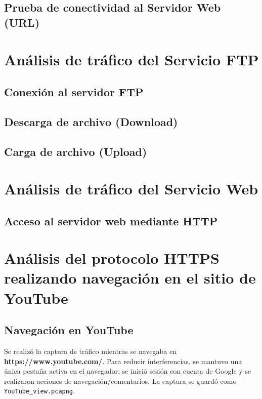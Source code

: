 \documentclass[10pt]{article}
\begin{document}
\subsection{Prueba de conectividad al Servidor Web (URL)}


\renewcommand{\thesection}{8.\arabic{section}}
\section{Análisis de tráfico del Servicio FTP}
\subsection{Conexión al servidor FTP}
\subsection{Descarga de archivo (Download)}
\subsection{Carga de archivo (Upload)}

\renewcommand{\thesection}{8.\arabic{section}}
\section{Análisis de tráfico del Servicio Web}
\subsection{Acceso al servidor web mediante HTTP}

\renewcommand{\thesection}{8.\arabic{section}}
\section{Análisis del protocolo HTTPS realizando navegación en el sitio de YouTube}

\subsection{Navegación en YouTube}
Se realizó la captura de tráfico mientras se navegaba en \textbf{https://www.youtube.com/}. 
Para reducir interferencias, se mantuvo una única pestaña activa en el navegador; se inició sesión con cuenta de Google y se realizaron acciones de navegación/comentarios. 
La captura se guardó como \texttt{YouTube\_view.pcapng}.
\end{document}
